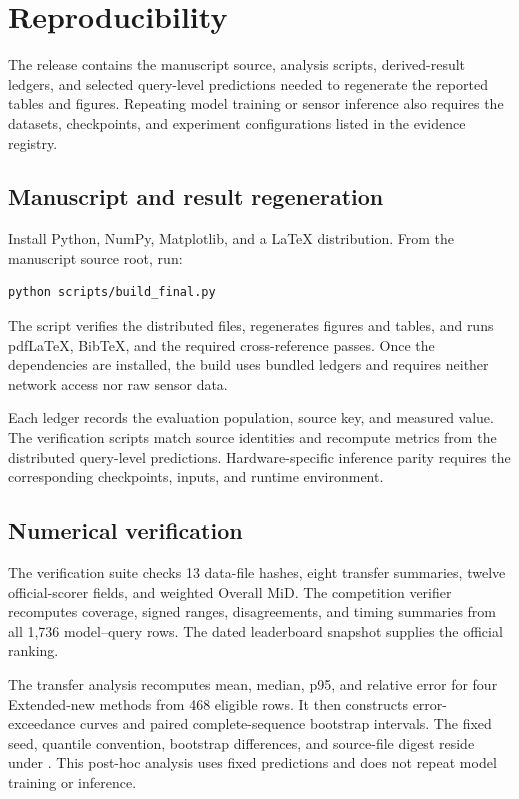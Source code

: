 \section{Reproducibility}
\label{app:reproduction}

The release contains the manuscript source, analysis scripts, derived-result
ledgers, and selected query-level predictions needed to regenerate the reported
tables and figures. Repeating model training or sensor inference also requires
the datasets, checkpoints, and experiment configurations listed in the evidence
registry.

\subsection{Manuscript and result regeneration}

Install Python, NumPy, Matplotlib, and a LaTeX distribution. From the manuscript
source root, run:
\begin{lstlisting}
python scripts/build_final.py
\end{lstlisting}
The script verifies the distributed files, regenerates figures and tables, and
runs pdfLaTeX, BibTeX, and the required cross-reference passes. Once the
dependencies are installed, the build uses bundled ledgers and requires neither
network access nor raw sensor data.

Each ledger records the evaluation population, source key, and measured value.
The verification scripts match source identities and recompute metrics from the
distributed query-level predictions. Hardware-specific inference parity requires
the corresponding checkpoints, inputs, and runtime environment.

\subsection{Numerical verification}
The verification suite checks 13 data-file hashes, eight transfer summaries, twelve official-scorer fields, and weighted Overall MiD. The competition verifier recomputes coverage, signed ranges, disagreements, and timing summaries from all 1,736 model--query rows. The dated leaderboard snapshot supplies the official ranking.



The transfer analysis recomputes mean, median, p95, and relative error for four Extended-new methods from 468 eligible rows. It then constructs error-exceedance curves and paired complete-sequence bootstrap intervals. The fixed seed, quantile convention, bootstrap differences, and source-file digest reside under . This post-hoc analysis uses fixed predictions and does not repeat model training or inference.

